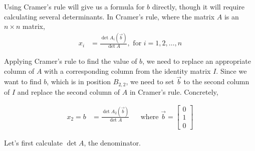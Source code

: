 \documentclass[10pt,letterpaper,final]{report}
\newcommand{\reason}[1]{&& \text{#1}}
\begin{document}
Using Cramer's rule will give us a formula for $b$ directly, though it will require calculating several determinants. In Cramer's rule, where the matrix $A$ is an $n \times n$ matrix, \begin{align*}
  x_i & = \frac{\det A_i(\vec{b})}{\det A},\text{ for } i = 1,2,\dots, n
\end{align*}

Applying Cramer's rule to find the value of $b$, we need to replace an appropriate column of $A$ with a corresponding column from the identity matrix $I$. Since we want to find $b$, which is in position $B_{2,2}$, we need to set $\vec{b}$ to the second column of $I$ and replace the second column of $A$ in Cramer's rule. Concretely,

\begin{align*}
  x_2 = b & = \frac{\det A_2(\vec{b})}{\det A} \reason{where $\vec{b} = \begin{bmatrix}
                                                     0 \\ 1 \\ 0
                                                   \end{bmatrix}$}
\end{align*}

\noindent Let's first calculate $\det A$, the denominator.
\end{document}
